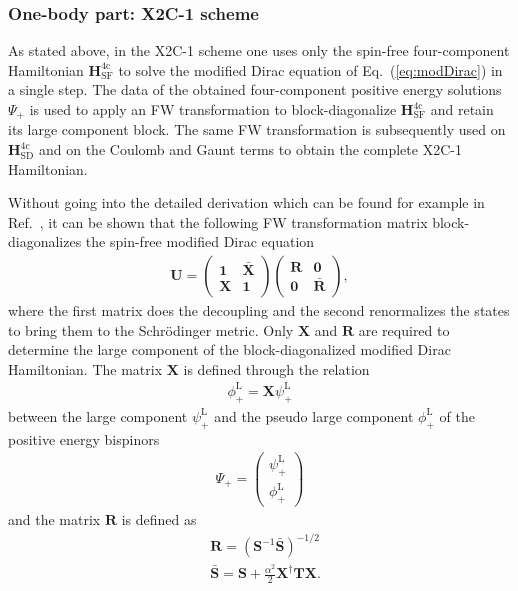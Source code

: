 \documentclass[10pt,aps,prb,twocolumn,amsmath,amssymb,superscriptaddress]{revtex4-1}
\renewcommand\b[1]{\ensuremath{\mathbf{#1}}}
\begin{document}
\subsubsection{One-body part: X2C-1 scheme}

As stated above, in the X2C-1 scheme one uses only the spin-free four-component Hamiltonian $\b{H}^\text{4c}_\text{SF}$ to solve the modified Dirac equation of Eq.~(\ref{eq:modDirac}) in a single step.
The data of the obtained four-component positive energy solutions $\Psi_+$
is used to apply an FW transformation to block-diagonalize $\b{H}^\text{4c}_\text{SF}$ and retain its large component block.
The same FW transformation is subsequently used on $\b{H}^\text{4c}_\text{SD}$ and on the Coulomb and Gaunt terms to obtain the complete X2C-1 Hamiltonian.

Without going into the detailed derivation which can be found for example in Ref.~, it can be shown that the following FW transformation matrix block-diagonalizes the spin-free modified Dirac equation
\begin{align}
    \b{U} = \begin{pmatrix} \b{1} &\bar{\b{X}}\\ \b{X}& \b{1}\end{pmatrix}
    \begin{pmatrix} \b{R} &\b{0}\\ \b{0}& \bar{\b{R}}\end{pmatrix}
\label{eq:U}
,\end{align}
where the first matrix does the decoupling and the second renormalizes the states to bring them to the Schr\"{o}dinger metric. Only $\b{X}$ and $\b{R}$ are required to determine the large component of the block-diagonalized modified Dirac Hamiltonian. 
The matrix $\b{X}$ is defined through the relation 
\begin{align}
\phi^\text{L}_+=\b{X}\psi^\text{L}_+ \label{eq:X}
\end{align}
between the large component $\psi_+^\text{L}$ and the pseudo large component $\phi_+^\text{L}$ of the positive energy bispinors
\begin{align}
\Psi_+ = \begin{pmatrix}
 \psi_+^\text{L}\\
 \phi_+^\text{L}
\end{pmatrix}
\end{align}
and the matrix $\b{R}$ is defined as
\begin{align}
&\b{R}       = (\b{S}^{-1}\bar{\b{S}})^{-1/2}                    \label{eq:R} \\
&\bar{\b{S}} = \b{S} + \frac{\alpha^2}{2}\b{X}^\dag \b{T} \b{X}.
\end{align}
\end{document}

